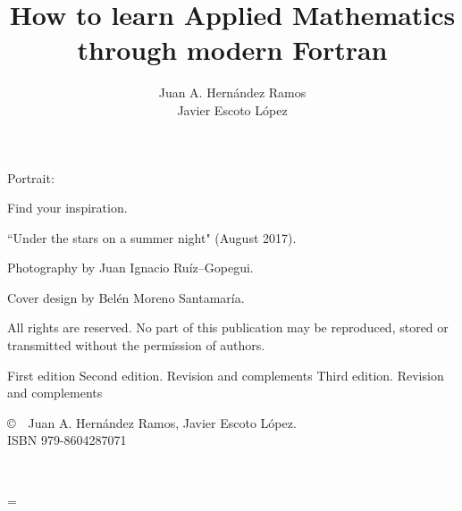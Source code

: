 \documentclass[twoside,english]{book}
\title{How to learn Applied Mathematics through modern Fortran}
\author{Juan A. Hern\'andez Ramos \\
            Javier Escoto L\'opez \\ \vspace{7cm} }
\date{ }
\begin{document}
    
    \maketitle
    \thispagestyle{empty}
    \clearpage
    

    
    \noindent Portrait:
    
    \noindent Find your inspiration.
    
    \noindent  ``Under the stars on a summer night" (August 2017). 
    
    \noindent  Photography by Juan Ignacio Ruíz--Gopegui. 
    
    \noindent  Cover design by Belén Moreno Santamaría.
    
       
    
    \vfill  
    
    \noindent
    All rights are reserved. No part of this publication may be reproduced, stored or transmitted without the permission of authors. 
    \vspace{2\baselineskip}
    
    
     First edition \newline
     Second edition. Revision and complements \newline    
     Third edition. Revision and complements \newline
    
    
    \noindent \copyright   \ \  Juan A. Hernández Ramos, Javier Escoto López. \\
    
    
    \noindent ISBN 979-8604287071 \\
     \clearpage
     
  
    \frontmatter
    \tableofcontents
    
     
    \newpage
    ~\clearpage
    
  
     
    \newpage
    \clearpage
    
  
    \mainmatter
    \parskip = \baselineskip
    \newcommand{\home}{./}
    
   
    

   
%   
%      
     
\end{document}
